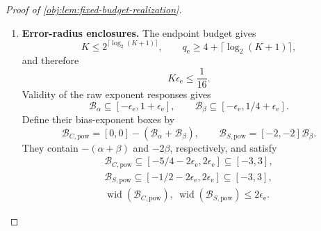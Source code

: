 \begin{proof}[Proof of \cref{obj:lem:fixed-budget-realization}]
\begin{enumerate}
The binary marks used in \cref{obj:def:coordinate-estimates} are exact rational numbers in \([0,1]\). Multiplication by their products preserves the displayed kernel-width bound. There are exactly
\[
\#\{(i,i'):1\le i,i'\le n,\ i\ne i'\}=n(n-1)
\]
ordered pairs. Hence the positive rational normalization in \cref{obj:def:projection-statistic} cancels this factor in the sum of widths:
\[
\operatorname{wid}\bigl(\mathcal B[\mathbb U_{n,k}(W,V)]\bigr)
\le
\frac{n(n-1)\,160k^2\epsilon_{\mathrm e}}{n(n-1)}
=160k^2\epsilon_{\mathrm e}
\]
for the marks used here. The empirical mean in \(\widehat C_n\) is exact. Soundness of the operations therefore supplies successful coordinate boxes with
\[
\begin{gathered}
\widehat C_n\in\mathcal B[\widehat C_n],
\qquad
\widehat S_n\in\mathcal B[\widehat S_n],\\
\operatorname{wid}\bigl(\mathcal B[\widehat C_n]\bigr)
\le160k_C^2\epsilon_{\mathrm e},
\qquad
\operatorname{wid}\bigl(\mathcal B[\widehat S_n]\bigr)
\le160k_S^2\epsilon_{\mathrm e}.
\end{gathered}
\]

\item \textbf{Error-radius enclosures.}
The endpoint budget gives
\[
K\le2^{\lceil\log_2(K+1)\rceil},
\qquad
q_{\mathrm e}\ge4+\lceil\log_2(K+1)\rceil,
\]
and therefore
\[
K\epsilon_{\mathrm e}\le\frac1{16}.
\]
Validity of the raw exponent responses gives
\[
\mathcal B_\alpha\subseteq[-\epsilon_{\mathrm e},1+\epsilon_{\mathrm e}],
\qquad
\mathcal B_\beta\subseteq[-\epsilon_{\mathrm e},1/4+\epsilon_{\mathrm e}].
\]
Define their bias-exponent boxes by
\[
\mathcal B_{C,\mathrm{pow}}=[0,0]-(\mathcal B_\alpha+\mathcal B_\beta),
\qquad
\mathcal B_{S,\mathrm{pow}}=[-2,-2]\mathcal B_\beta.
\]
They contain \(-(\alpha+\beta)\) and \(-2\beta\), respectively, and satisfy
\[
\begin{gathered}
\mathcal B_{C,\mathrm{pow}}
\subseteq[-5/4-2\epsilon_{\mathrm e},2\epsilon_{\mathrm e}]
\subseteq[-3,3],\\
\mathcal B_{S,\mathrm{pow}}
\subseteq[-1/2-2\epsilon_{\mathrm e},2\epsilon_{\mathrm e}]
\subseteq[-3,3],\\
\operatorname{wid}(\mathcal B_{C,\mathrm{pow}}),
\ \operatorname{wid}(\mathcal B_{S,\mathrm{pow}})
\le2\epsilon_{\mathrm e}.
\end{gathered}
\]


\end{enumerate}
\end{proof}
